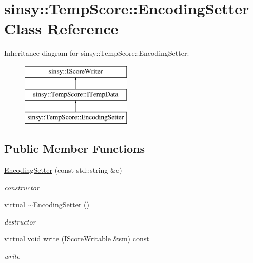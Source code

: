 \hypertarget{classsinsy_1_1TempScore_1_1EncodingSetter}{\section{sinsy\-:\-:\-Temp\-Score\-:\-:\-Encoding\-Setter \-Class \-Reference}
\label{classsinsy_1_1TempScore_1_1EncodingSetter}
}
\-Inheritance diagram for sinsy\-:\-:\-Temp\-Score\-:\-:\-Encoding\-Setter\-:\begin{figure}[H]
\begin{center}
\leavevmode
\includegraphics[height=3.000000cm]{classsinsy_1_1TempScore_1_1EncodingSetter}
\end{center}
\end{figure}
\subsection*{\-Public \-Member \-Functions}
\begin{DoxyCompactItemize}
\item 
\hypertarget{classsinsy_1_1TempScore_1_1EncodingSetter_a63a40122ab9e305eaf958f1698777877}{\hyperlink{classsinsy_1_1TempScore_1_1EncodingSetter_a63a40122ab9e305eaf958f1698777877}{\-Encoding\-Setter} (const std\-::string \&e)}\label{classsinsy_1_1TempScore_1_1EncodingSetter_a63a40122ab9e305eaf958f1698777877}

\begin{DoxyCompactList}\small\item\em constructor \end{DoxyCompactList}\item 
\hypertarget{classsinsy_1_1TempScore_1_1EncodingSetter_a63176cea655789315decbdf0c1cfc238}{virtual \hyperlink{classsinsy_1_1TempScore_1_1EncodingSetter_a63176cea655789315decbdf0c1cfc238}{$\sim$\-Encoding\-Setter} ()}\label{classsinsy_1_1TempScore_1_1EncodingSetter_a63176cea655789315decbdf0c1cfc238}

\begin{DoxyCompactList}\small\item\em destructor \end{DoxyCompactList}\item 
\hypertarget{classsinsy_1_1TempScore_1_1EncodingSetter_a92c8fea4d11bdad2efab9ef245ff5c0e}{virtual void \hyperlink{classsinsy_1_1TempScore_1_1EncodingSetter_a92c8fea4d11bdad2efab9ef245ff5c0e}{write} (\hyperlink{classsinsy_1_1IScoreWritable}{\-I\-Score\-Writable} \&sm) const }\label{classsinsy_1_1TempScore_1_1EncodingSetter_a92c8fea4d11bdad2efab9ef245ff5c0e}

\begin{DoxyCompactList}\small\item\em write \end{DoxyCompactList}\end{DoxyCompactItemize}


